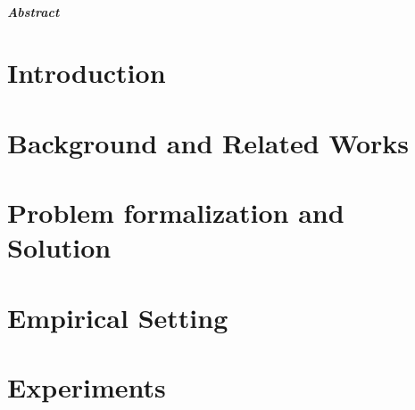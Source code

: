 \documentclass[12pt, titlepage, a4paper]{book}
\begin{document}
\begin{frontespizio}
\Rientro {1.5cm}
\end{frontespizio}



% 
% 

\tableofcontents

\newpage

\paragraph{Abstract}


\chapter{Introduction}\label{chap:intro}



\chapter{Background and Related Works}\label{chap:related}


\chapter{Problem formalization and Solution}\label{chap:problem}




\chapter{Empirical Setting} \label{chap:ros}


\chapter{Experiments}\label{chap:experiments}

\end{document}
